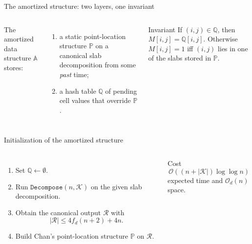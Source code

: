 \documentclass[aspectratio=169,professionalfonts]{beamer}
\newcommand{\Oh}{\mathcal{O}}
\newcommand{\fd}{f_d}
\newcommand{\cK}{\mathcal{K}}
\newcommand{\cR}{\mathcal{R}}
\newcommand{\bbP}{\mathbb{P}}
\newcommand{\bbQ}{\mathbb{Q}}
\newcommand{\bbA}{\mathbb{A}}
\begin{document}
\begin{frame}[t]{The amortized structure: two layers, one invariant}
\begin{columns}[T,totalwidth=\textwidth]
The amortized data structure $\bbA$ stores:
\begin{enumerate}
\item a static point-location structure $\bbP$ on a canonical slab decomposition from some \emph{past} time;
\item a hash table $\bbQ$ of pending cell values that override $\bbP$.
\end{enumerate}
\begin{block}{Invariant}
If $(i,j)\in\bbQ$, then $M[i,j]=\bbQ[i,j]$.
Otherwise $M[i,j]=1$ iff $(i,j)$ lies in one of the slabs stored in $\bbP$.
\end{block}
\centering
{}
\end{columns}
\end{frame}

\begin{frame}[t]{Initialization of the amortized structure}
\begin{columns}[T,totalwidth=\textwidth]
\begin{enumerate}
\item Set $\bbQ\leftarrow\emptyset$.
\item Run $\mathtt{Decompose}(n,\cK)$ on the given slab decomposition.
\item Obtain the canonical output $\cR$ with
\[
|\cR|\le 4\fd(n+2)+4n.
\]
\item Build Chan's point-location structure $\bbP$ on $\cR$.
\end{enumerate}
\begin{block}{Cost}
\[
\Oh((n+|\cK|)\log\log n)
\]
expected time and $\Oh_d(n)$ space.
\end{block}
\centering
{}
\end{columns}
\end{frame}
\end{document}
